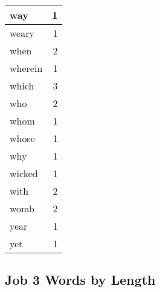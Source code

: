 \begin{center}
\begin{longtable}{l|r}
way & 1\\ \hline 
weary & 1\\ \hline 
when & 2\\ \hline 
wherein & 1\\ \hline 
which & 3\\ \hline 
who & 2\\ \hline 
whom & 1\\ \hline 
whose & 1\\ \hline 
why & 1\\ \hline 
wicked & 1\\ \hline 
with & 2\\ \hline 
womb & 2\\ \hline 
year & 1\\ \hline 
yet & 1\\ \hline 
\end{longtable}
\end{center}





\subsection{Job 3 Words by Length}


\normalsize
 
